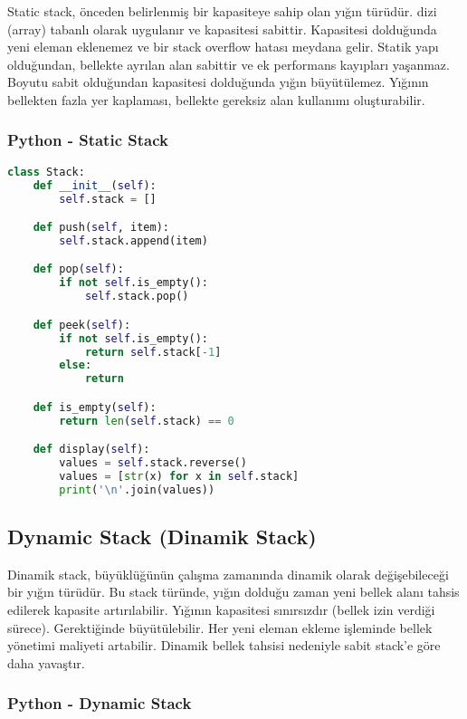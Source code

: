 Static stack, önceden belirlenmiş bir kapasiteye sahip olan yığın türüdür. dizi (array) tabanlı olarak uygulanır ve kapasitesi sabittir. Kapasitesi dolduğunda yeni eleman eklenemez ve bir stack overflow hatası meydana gelir. Statik yapı olduğundan, bellekte ayrılan alan sabittir ve ek performans kayıpları yaşanmaz. Boyutu sabit olduğundan kapasitesi dolduğunda yığın büyütülemez. Yığının bellekten fazla yer kaplaması, bellekte gereksiz alan kullanımı oluşturabilir.

\subsubsection{Python - Static Stack}

\begin{lstlisting}[language=Python]
class Stack:
    def __init__(self):
        self.stack = []

    def push(self, item):
        self.stack.append(item)

    def pop(self):
        if not self.is_empty():
            self.stack.pop()

    def peek(self):
        if not self.is_empty():
            return self.stack[-1]
        else:
            return

    def is_empty(self):
        return len(self.stack) == 0

    def display(self):
        values = self.stack.reverse()
        values = [str(x) for x in self.stack]
        print('\n'.join(values))
\end{lstlisting}

\newpage

\subsection{Dynamic Stack (Dinamik Stack)}

Dinamik stack, büyüklüğünün çalışma zamanında dinamik olarak değişebileceği bir yığın türüdür. Bu stack türünde, yığın dolduğu zaman yeni bellek alanı tahsis edilerek kapasite artırılabilir. Yığının kapasitesi sınırsızdır (bellek izin verdiği sürece). Gerektiğinde büyütülebilir. Her yeni eleman ekleme işleminde bellek yönetimi maliyeti artabilir. Dinamik bellek tahsisi nedeniyle sabit stack’e göre daha yavaştır.

\subsubsection{Python - Dynamic Stack}

